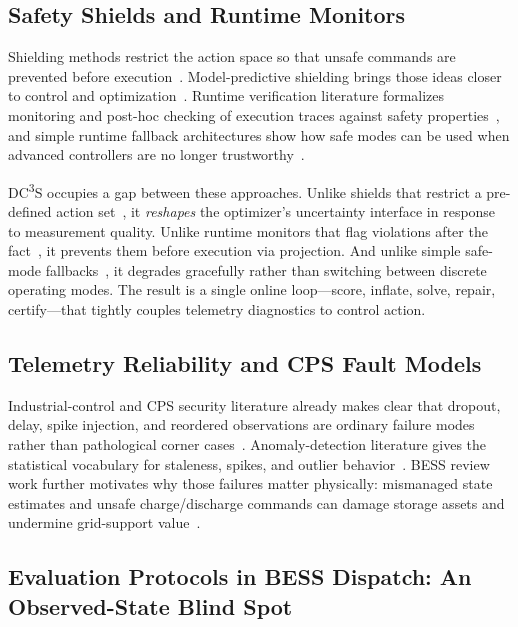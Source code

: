 \documentclass[11pt,a4paper]{article}
\begin{document}
\subsection{Safety Shields and Runtime Monitors}

Shielding methods restrict the action space so that unsafe commands are prevented before execution~\cite{alshiekh2018safe,konighofer2020shield}. Model-predictive shielding brings those ideas closer to control and optimization~\cite{bastani2021safe}. Runtime verification literature formalizes monitoring and post-hoc checking of execution traces against safety properties~\cite{leucker2009brief}, and simple runtime fallback architectures show how safe modes can be used when advanced controllers are no longer trustworthy~\cite{sha2001using}.

DC\textsuperscript{3}S occupies a gap between these approaches. Unlike shields that restrict a pre-defined action set~\cite{alshiekh2018safe}, it \emph{reshapes} the optimizer's uncertainty interface in response to measurement quality. Unlike runtime monitors that flag violations after the fact~\cite{leucker2009brief}, it prevents them before execution via projection. And unlike simple safe-mode fallbacks~\cite{sha2001using}, it degrades gracefully rather than switching between discrete operating modes. The result is a single online loop---score, inflate, solve, repair, certify---that tightly couples telemetry diagnostics to control action.

\subsection{Telemetry Reliability and CPS Fault Models}

Industrial-control and CPS security literature already makes clear that dropout, delay, spike injection, and reordered observations are ordinary failure modes rather than pathological corner cases~\cite{dibaji2019systems}. Anomaly-detection literature gives the statistical vocabulary for staleness, spikes, and outlier behavior~\cite{chandola2009anomaly}. BESS review work further motivates why those failures matter physically: mismanaged state estimates and unsafe charge/discharge commands can damage storage assets and undermine grid-support value~\cite{chen2020review_bess}.

\subsection{Evaluation Protocols in BESS Dispatch: An Observed-State Blind Spot}
\end{document}
